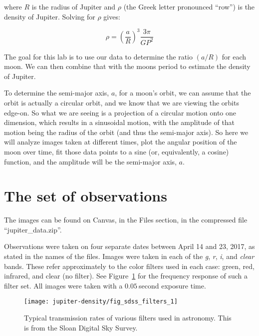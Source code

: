 where $R$ is the radius of Jupiter and $\rho$ (the Greek letter pronounced ``row'') is the density of Jupiter. Solving for $\rho$ gives:

\begin{equation}\label{jd:eqn:kepden}
\rho = \left(\frac{a}{R}\right)^3\frac{3\pi}{G P^2}
\end{equation}

The goal for this lab is to use our data to determine the ratio $(a/R)$ for each moon. We can then combine that with the moons period to estimate the density of Jupiter.

To determine the semi-major axis, $a$, for a moon's orbit, we can assume that the orbit is actually a circular orbit, and we know that we are viewing the orbits edge-on. So what we are seeing is a projection of a circular motion onto one dimension, which results in a sinusoidal motion, with the amplitude of that motion being the radius of the orbit (and thus the semi-major axis). So here we will analyze images taken at different times, plot the angular position of the moon over time, fit those data points to a sine (or, equivalently, a cosine) function, and the amplitude will be the semi-major axis, $a$.

\section{The set of observations}

The images can be found on Canvas, in the Files section, in the compressed file ``jupiter\_data.zip''.

Observations were taken on four separate dates between April 14 and 23, 2017, as stated in the names of the files. Images were taken in each of the \textit{g}, \textit{r}, \textit{i}, and \textit{clear} bands. These refer approximately to the color filters used in each case: green, red, infrared, and  clear (no filter). See Figure~\ref{jd:fig:filters} for the frequency response of such a filter set. All images were taken with a $0.05\:$second exposure time.

\begin{figure}
	\centering
	\texttt{[image: jupiter-density/fig\_sdss\_filters\_1]}
	\caption{Typical transmission rates of various filters used in astronomy. This is from the Sloan Digital Sky Survey.}\label{jd:fig:filters}
\end{figure}

%
%
%
